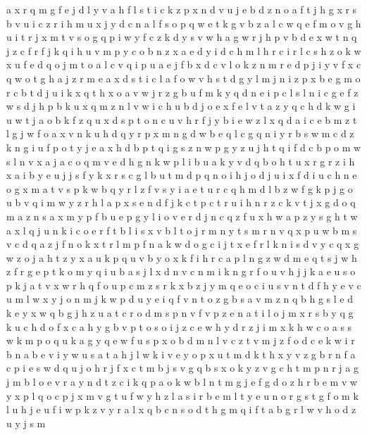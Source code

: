 \documentclass{article}
\begin{document}
a x r q m g f e j d l y
v
a h f l s t i c k z p x n d v u j e b
d z n o a f t j h g x r s b v u i c
z r i h m u x j y d c n a l f s o p q w e t k g v b
z a l c w q e f m o v g h u i t
r j
x m t v s o g q p i w y f c z
k d y s v w h
a g w r j h p v b d e x
w t n q j z c f
r f j k q i h u v m p y c o b n z x a e d
y i d c h m l
h r c i
r l c s h z o k w x u f e d q
o
j m t o a l c v q i p
u a e j f b x d c v l o k
z n m r e d p j i y v f x c q w o t g h a
j z r m e a x d s t i c l
a f o w v h s t d g y l m j n i z p x b
e g m o r c b t d j u i k x q
t h x o a v w j r z g b u f m k y q d n e i p c l s
l n i c g e f z w s d j h p b k u x q m
z n l v w i c h u b d j o e
x f e l v t a z y q c h d k w g i u
w t j a o b k f z q u x d
s p t o n c u v h r f j y b i e w z l x q d a
i c e b m z t l g j w f o a x v n k u h d q y r p
x m n g d w b e q l c
g q n i y
r b s w m c d z k n g i u f p o t y j e a x h
d b p t q i g s
z n w p
g y z u j h t q i f d c b p o m w s l n v x a
j a c o q m v e d h g n k w p l i b u
a k y v d q b o h t u x r g
r z
i h
x a i b y e u j
j s f y k x
r s c g l b u t m d p q n o i h j
o d j u i x f
d i u c h n e o g x m a t v s p k w b q y r l z f
v s y i a e t u r c q h m d l b z w f g k p j
g o u b v q i m w y z r h l a p x s e n d f j k c t
p c t r
u i h n r z c k v t j x g d o q m a
z n s a x m y p f b
u e p
g y l i o v e r d j n c q z f u x h w a p
z y s g h t w a x l q j u n k i c o e r f
t b l
i s x v b l t o j r m n y
t s m
r n v q x
p u w b m s v c d q a z j f n o k x t r l
m p f n a k w d o g c i j t x
e f r l k n i s d v y c q x g w z o j a
h t z y x a u k p q
u v b y o x k f i h r c a p l n g z w d m e q t s j
w h z f r g e p t k o m y q i u b a s j l x d n v c
n m i k
n g r f o u v h j
j k a e u s o p
k j a t v x w r h q f o u p c m z s
r k x b z j y m q e o c i u s v n t d f h
y e v c u m
l w x y j o n
m j k w p d u y e i q f v n t o z g b s
a v m z n q b h g s l e d
k e y x w q b g j h z u a t c r o d m s p n v f
v p z e n a t i l o j m x r s b y q g k u c h d
o f x c a h y g b v p
t o s
o i j z
c e w h y d
r z j i m x k h w c o a s
s w k m p o q u
k a g y q e w f u s p x o b d m n l v c z t
v m j z f o d c e k w i r b n a
b e v i y w u s a t
a h j l w k i v e y o p x u t m d
k t h x y v z g b r n f a c p i e s w d q u j o
h r j f
x c t m b j s v g
q b s x o k y z v g c h t m p n r j a
g j m b l o e v r a y n d t z c i k q
p a o k w b l n t
m g j e
f g d o z h r b e m v w y x p l q
o c p j x m v g t u f w y h z l a s i r b e
m
l t y e u n o r g
s t g f o m k l u h
j e u f i w p k z v y r a l x q b c n s o d t h g m
q i f t a b g r l w v h o d z u y j s m
\end{document}
